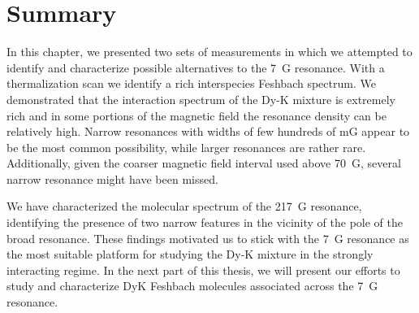 \section{Summary}

In this chapter, we  presented two sets of measurements in which we attempted to identify and characterize possible alternatives to the \SI{7}{G} resonance. With a thermalization scan we identify a rich interspecies Feshbach spectrum. We demonstrated that the interaction spectrum of the Dy-K mixture is extremely rich and in some portions of the magnetic field the resonance density can be relatively high. Narrow resonances with widths of few hundreds of mG appear to be the most common possibility, while larger resonances are rather rare. Additionally, given the coarser magnetic field interval used above \SI{70}{G}, several narrow resonance might have been missed.  

We have characterized the molecular spectrum of the \SI{217}{G} resonance, identifying the presence of two narrow features in the vicinity of the pole of the broad resonance. These findings motivated us to stick with the \SI{7}{G} resonance as the most suitable platform for studying the Dy-K mixture in the strongly interacting regime. In the next part of this thesis, we will present our efforts to study and characterize DyK Feshbach molecules associated across the \SI{7}{G} resonance.


